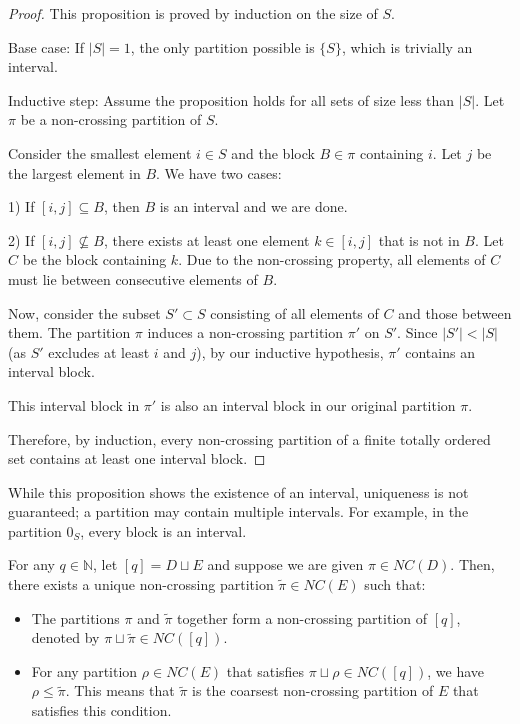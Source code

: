 \begin{proof}
This proposition is proved by induction on the size of $S$.

Base case: If $|S| = 1$, the only partition possible is $\{S\}$, which is trivially an interval.

Inductive step: Assume the proposition holds for all sets of size less than $|S|$. Let $\pi$ be a non-crossing partition of $S$.

Consider the smallest element $i \in S$ and the block $B \in \pi$ containing $i$. Let $j$ be the largest element in $B$. We have two cases:

1) If $[i,j] \subseteq B$, then $B$ is an interval and we are done.

2) If $[i,j] \not\subseteq B$, there exists at least one element $k \in [i,j]$ that is not in $B$. Let $C$ be the block containing $k$. Due to the non-crossing property, all elements of $C$ must lie between consecutive elements of $B$.

Now, consider the subset $S' \subset S$ consisting of all elements of $C$ and those between them. The partition $\pi$ induces a non-crossing partition $\pi'$ on $S'$. Since $|S'| < |S|$ (as $S'$ excludes at least $i$ and $j$), by our inductive hypothesis, $\pi'$ contains an interval block.

This interval block in $\pi'$ is also an interval block in our original partition $\pi$.

Therefore, by induction, every non-crossing partition of a finite totally ordered set contains at least one interval block.
\end{proof}

While this proposition shows the existence of an interval, uniqueness is not guaranteed; a partition may contain multiple intervals. For example, in the partition $0_S$, every block is an interval.

\begin{lemma}\label{pi-tilde-lemma}
For any $q \in \mathbb{N}$, let $[q] = D \sqcup E$ and suppose we are given $\pi \in NC(D)$. Then, there exists a unique non-crossing partition $\tilde{\pi} \in NC(E)$ such that:
\begin{itemize}
    \item The partitions $\pi$ and $\tilde{\pi}$ together form a non-crossing partition of $[q]$, denoted by $\pi \sqcup \tilde{\pi} \in NC([q])$.
    \item For any partition $\rho \in NC(E)$ that satisfies $\pi \sqcup \rho \in NC([q])$, we have $\rho \leq \tilde{\pi}$. This means that $\tilde{\pi}$ is the coarsest non-crossing partition of $E$ that satisfies this condition.
\end{itemize}
\end{lemma}

